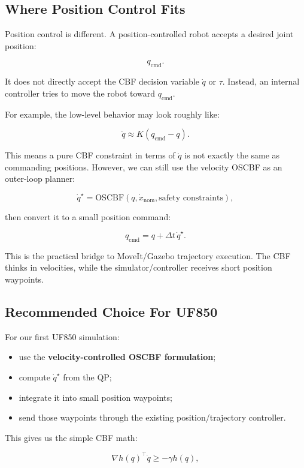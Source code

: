 \documentclass[11pt]{article}
\begin{document}
\subsection{Where Position Control Fits}

Position control is different. A position-controlled robot accepts a desired
joint position:

\[
q_{\mathrm{cmd}}.
\]

It does not directly accept the CBF decision variable $\dot{q}$ or $\tau$.
Instead, an internal controller tries to move the robot toward
$q_{\mathrm{cmd}}$.

For example, the low-level behavior may look roughly like:

\[
\dot{q} \approx K(q_{\mathrm{cmd}} - q).
\]

This means a pure CBF constraint in terms of $\dot{q}$ is not exactly the same
as commanding positions. However, we can still use the velocity OSCBF as an
outer-loop planner:

\[
\dot{q}^{\star}
= \text{OSCBF}(q, \dot{x}_{\mathrm{nom}}, \text{safety constraints}),
\]

then convert it to a small position command:

\[
q_{\mathrm{cmd}}
= q + \Delta t\,\dot{q}^{\star}.
\]

This is the practical bridge to MoveIt/Gazebo trajectory execution. The CBF
thinks in velocities, while the simulator/controller receives short position
waypoints.

\subsection{Recommended Choice For UF850}

For our first UF850 simulation:

\begin{itemize}[leftmargin=*]
    \item use the \textbf{velocity-controlled OSCBF formulation};
    \item compute $\dot{q}^{\star}$ from the QP;
    \item integrate it into small position waypoints;
    \item send those waypoints through the existing position/trajectory
    controller.
\end{itemize}

This gives us the simple CBF math:

\[
\nabla h(q)^\top \dot{q}
\ge
-\gamma h(q),
\]
\end{document}
